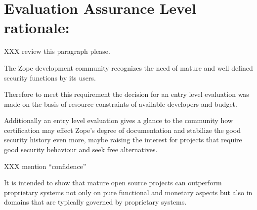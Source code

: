 \documentclass[10pt,a4paper,english]{book}
\begin{document}
\hypertarget{evaluation-assurance-level-rationale}{}
\section{Evaluation Assurance Level rationale:}

XXX review this paragraph please.

The Zope development community recognizes the need of mature and well defined
security functions by its users.

Therefore to meet this requirement the decision for an entry level evaluation
was made on the basis of resource constraints of available developers and
budget.

Additionally an entry level evaluation gives a glance to the community how
certification may effect Zope's degree of documentation and stabilize the good
security history even more, maybe raising the interest for projects that
require good security behaviour and seek free alternatives.

XXX mention ``confidence''

It is intended to show that mature open source projects can outperform
proprietary systems not only on pure functional and monetary aspects but also
in domains that are typically governed by proprietary systems.



\hypertarget{glossary}{}
\end{document}
